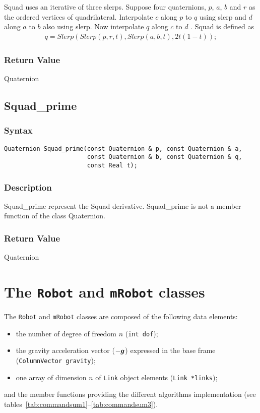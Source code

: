 \documentclass[11pt,fleqn,letterpaper]{report}
\newcommand{\mbold}[1]{\mbox{\boldmath $ #1 $}}
\begin{document}
Squad uses an iterative of three slerps. Suppose four quaternions,
$p$, $a$, $b$ and $r$ as the ordered vertices of quadrilateral.
Interpolate $c$ along $p$ to $q$ using slerp and $d$ along $a$ to $b$
also using slerp. Now interpolate $q$ along $c$ to $d$ \cite{Dam98}.
Squad is defined as
\begin{eqnarray}
  q = Slerp(Slerp(p,r,t),Slerp(a,b,t),2t(1-t));
\end{eqnarray}
 
\subsubsection*{Return Value}

Quaternion

\newpage

\subsection*{Squad\_prime}

\subsubsection*{Syntax}
\begin{verbatim}
Quaternion Squad_prime(const Quaternion & p, const Quaternion & a, 
                       const Quaternion & b, const Quaternion & q, 
                       const Real t);
\end{verbatim}
\subsubsection{Description}
Squad\_prime represent the Squad derivative.  Squad\_prime is not a
member function of the class Quaternion.

\subsubsection*{Return Value}

Quaternion

\newpage

\section{The \texttt{Robot} and \texttt{mRobot} classes}

The \texttt{Robot} and \texttt{mRobot} classes are composed of the
following data elements:
\begin{itemize}
\item the number of degree of freedom $n$ ({\tt int dof});
\item the gravity acceleration vector ($-\mbold{g}$) expressed in the
  base frame \\({\tt ColumnVector gravity});
\item one array of dimension $n$ of \texttt{Link} object elements
  ({\tt Link *links});
\end{itemize}
and the member functions providing the different algorithms implementation 
(see tables~\ref{tab:commandsum1}--\ref{tab:commandsum3}).
\end{document}
